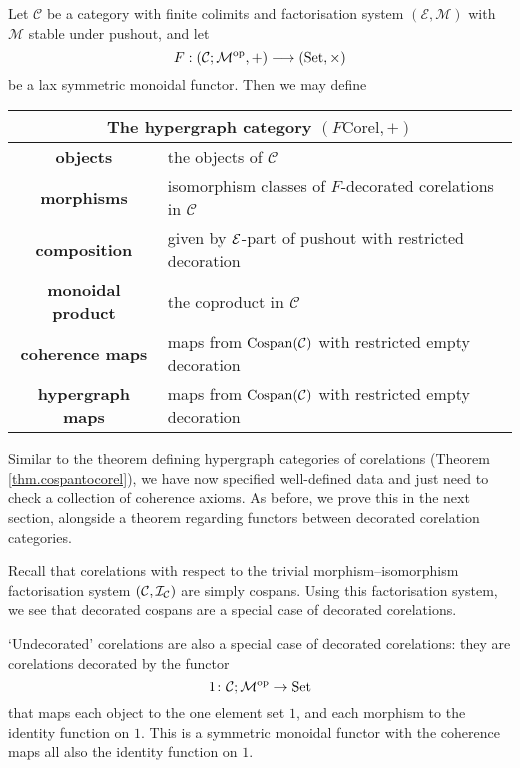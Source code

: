 \begin{theorem} \label{thm.fcorel}
  Let $\mathcal C$ be a category with finite colimits and factorisation system
  $(\mathcal E, \mathcal M)$ with $\mathcal M$ stable under pushout, and let 
  \[
    F: (\mathcal C;\mathcal M^{\mathrm{op}},+) \longrightarrow (\mathrm{Set}, \times)
  \]
  be a lax symmetric monoidal functor.  Then we may define 
  \smallskip 

  \begin{center}
    \begin{tabular}{| c | p{} |}
      \hline
      \multicolumn{2}{|c|}{The hypergraph category $(F\mathrm{Corel},+)$} \\
      \hline
      \textbf{objects} & the objects of $\mathcal C$ \\ 
      \textbf{morphisms} & isomorphism classes of $F$-decorated corelations in
      $\mathcal C$\\ 
      \textbf{composition} & given by $\mathcal E$-part of pushout with restricted
      decoration  \\
      \textbf{monoidal product} & the coproduct in $\mathcal C$  \\
      \textbf{coherence maps} & maps from $\operatorname{{Cospan}}(\mathcal C)$ with restricted empty
      decoration \\
      \textbf{hypergraph maps} & maps from $\operatorname{{Cospan}}(\mathcal C)$ with restricted empty
      decoration \\
      \hline
    \end{tabular}
  \end{center}
  \smallskip 
\end{theorem}

Similar to the theorem defining hypergraph categories of corelations (Theorem
\ref{thm.cospantocorel}), we have now specified well-defined data and just need
to check a collection of coherence axioms. As before, we prove this in the next
section, alongside a theorem regarding functors between decorated corelation
categories.

\begin{examples} \label{ex.cospansascorels}
  Recall that corelations with respect to the trivial \linebreak
  morphism--isomorphism factorisation system $(\mathcal C, \mathcal I_{\mathcal C})$ are simply
  cospans. Using this factorisation system, we see that decorated cospans are a
  special case of decorated corelations.
\end{examples}

\begin{example} \label{ex.undeccorel}
  `Undecorated' corelations are also a special case of decorated
  corelations: they are corelations decorated by the functor 
  \[
    1{\colon} \mathcal C;\mathcal M^{\mathrm{op}} \to \mathrm{Set}
  \] 
  that maps each object to the one element set $1$, and each morphism to the
  identity function on $1$. This is a symmetric monoidal functor with the
  coherence maps all also the identity function on $1$.
\end{example}



